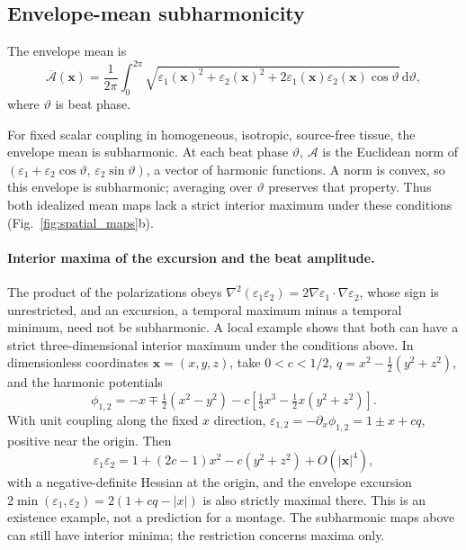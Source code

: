 \subsection{Envelope-mean subharmonicity}\label{supp:envelope-proof}
The envelope mean is
\[
\overline{\mathcal A}(\mathbf x)=\frac{1}{2\pi}\int_0^{2\pi}
\sqrt{\varepsilon_1(\mathbf x)^2+\varepsilon_2(\mathbf x)^2
+2\varepsilon_1(\mathbf x)\varepsilon_2(\mathbf x)\cos\vartheta}\,\mathrm d\vartheta,
\]
where $\vartheta$ is beat phase.

For fixed scalar coupling in homogeneous, isotropic, source-free tissue,
the envelope mean is subharmonic. At each beat phase $\vartheta$,
$\mathcal A$ is the Euclidean norm of
$(\varepsilon_1+\varepsilon_2\cos\vartheta,\,\varepsilon_2\sin\vartheta)$,
a vector of harmonic functions. A norm is convex, so this envelope is subharmonic;
averaging over $\vartheta$ preserves that property. Thus both idealized mean maps
lack a strict interior maximum under these conditions (Fig.~\ref{fig:spatial_maps}b).

\paragraph{Interior maxima of the excursion and the beat amplitude.}\label{supp:interior-maxima}
The product of the polarizations obeys
$\nabla^2(\varepsilon_1\varepsilon_2)=2\nabla\varepsilon_1\cdot\nabla\varepsilon_2$,
whose sign is unrestricted, and an excursion, a temporal maximum minus a temporal
minimum, need not be subharmonic. A local example shows that both can have a strict
three-dimensional interior maximum under the conditions above. In dimensionless
coordinates $\mathbf x=(x,y,z)$, take $0<c<1/2$, $q=x^2-\tfrac12(y^2+z^2)$, and the harmonic potentials
\[
\phi_{1,2}=-x\mp\tfrac12(x^2-y^2)-c\left[\tfrac13x^3-\tfrac12x(y^2+z^2)\right].
\]
With unit coupling along the fixed $x$ direction,
$\varepsilon_{1,2}=-\partial_x\phi_{1,2}=1\pm x+cq$, positive near the origin. Then
\[
\varepsilon_1\varepsilon_2=1+(2c-1)x^2-c(y^2+z^2)+O(|\mathbf x|^4),
\]
with a negative-definite Hessian at the origin, and the envelope excursion
$2\min(\varepsilon_1,\varepsilon_2)=2(1+cq-|x|)$ is also strictly maximal there.
This is an existence example, not a prediction for a montage. The subharmonic maps
above can still have interior minima; the restriction concerns maxima only.
